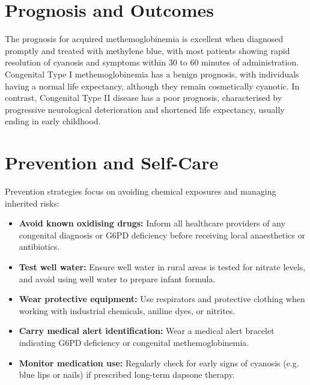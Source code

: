 \section*{Prognosis and Outcomes}
The prognosis for acquired methemoglobinemia is excellent when diagnosed promptly and treated with methylene blue, with most patients showing rapid resolution of cyanosis and symptoms within 30 to 60 minutes of administration. Congenital Type I methemoglobinemia has a benign prognosis, with individuals having a normal life expectancy, although they remain cosmetically cyanotic. In contrast, Congenital Type II disease has a poor prognosis, characterised by progressive neurological deterioration and shortened life expectancy, usually ending in early childhood.

\section*{Prevention and Self-Care}
Prevention strategies focus on avoiding chemical exposures and managing inherited risks:
\begin{itemize}
    \item \textbf{Avoid known oxidising drugs:} Inform all healthcare providers of any congenital diagnosis or G6PD deficiency before receiving local anaesthetics or antibiotics.
    \item \textbf{Test well water:} Ensure well water in rural areas is tested for nitrate levels, and avoid using well water to prepare infant formula.
    \item \textbf{Wear protective equipment:} Use respirators and protective clothing when working with industrial chemicals, aniline dyes, or nitrites.
    \item \textbf{Carry medical alert identification:} Wear a medical alert bracelet indicating G6PD deficiency or congenital methemoglobinemia.
    \item \textbf{Monitor medication use:} Regularly check for early signs of cyanosis (e.g. blue lips or nails) if prescribed long-term dapsone therapy.
\end{itemize}

